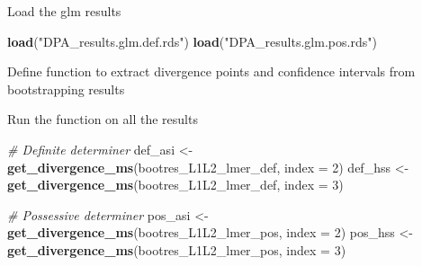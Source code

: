 \documentclass[
]{article}
\newenvironment{Shaded}{\begin{snugshade}}{\end{snugshade}}
\newcommand{\AttributeTok}[1]{\textcolor[rgb]{0.13,0.29,0.53}{#1}}
\newcommand{\CommentTok}[1]{\textcolor[rgb]{0.56,0.35,0.01}{\textit{#1}}}
\newcommand{\ConstantTok}[1]{\textcolor[rgb]{0.56,0.35,0.01}{#1}}
\newcommand{\ControlFlowTok}[1]{\textcolor[rgb]{0.13,0.29,0.53}{\textbf{#1}}}
\newcommand{\DecValTok}[1]{\textcolor[rgb]{0.00,0.00,0.81}{#1}}
\newcommand{\FunctionTok}[1]{\textcolor[rgb]{0.13,0.29,0.53}{\textbf{#1}}}
\newcommand{\NormalTok}[1]{#1}
\newcommand{\OtherTok}[1]{\textcolor[rgb]{0.56,0.35,0.01}{#1}}
\newcommand{\SpecialCharTok}[1]{\textcolor[rgb]{0.81,0.36,0.00}{\textbf{#1}}}
\newcommand{\StringTok}[1]{\textcolor[rgb]{0.31,0.60,0.02}{#1}}
\begin{document}
Load the glm results

\begin{Shaded}
\begin{Highlighting}[]
\FunctionTok{load}\NormalTok{(}\StringTok{"DPA\_results.glm.def.rds"}\NormalTok{)}
\FunctionTok{load}\NormalTok{(}\StringTok{"DPA\_results.glm.pos.rds"}\NormalTok{)}
\end{Highlighting}
\end{Shaded}

Define function to extract divergence points and confidence intervals
from bootstrapping results

\begin{Shaded}
\end{Shaded}

Run the function on all the results

\begin{Shaded}
\begin{Highlighting}[]
\CommentTok{\# Definite determiner}
\NormalTok{def\_asi }\OtherTok{\textless{}{-}} \FunctionTok{get\_divergence\_ms}\NormalTok{(bootres\_L1L2\_lmer\_def, }\AttributeTok{index =} \DecValTok{2}\NormalTok{)}
\NormalTok{def\_hss }\OtherTok{\textless{}{-}} \FunctionTok{get\_divergence\_ms}\NormalTok{(bootres\_L1L2\_lmer\_def, }\AttributeTok{index =} \DecValTok{3}\NormalTok{)}

\CommentTok{\# Possessive determiner}
\NormalTok{pos\_asi }\OtherTok{\textless{}{-}} \FunctionTok{get\_divergence\_ms}\NormalTok{(bootres\_L1L2\_lmer\_pos, }\AttributeTok{index =} \DecValTok{2}\NormalTok{)}
\NormalTok{pos\_hss }\OtherTok{\textless{}{-}} \FunctionTok{get\_divergence\_ms}\NormalTok{(bootres\_L1L2\_lmer\_pos, }\AttributeTok{index =} \DecValTok{3}\NormalTok{)}
\end{Highlighting}
\end{Shaded}
\end{document}
